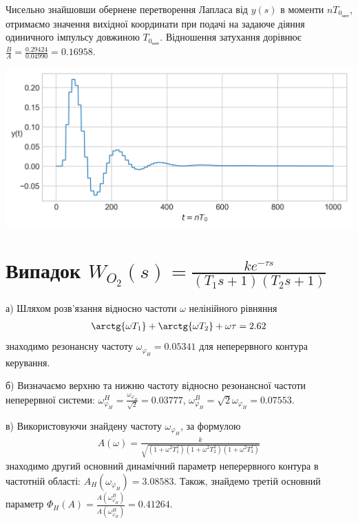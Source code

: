 Чисельно знайшовши обернене перетворення Лапласа від $y(s)$ в моменти $n T_{0_{\text{опт}}}$, 
отримаємо значення вихідної координати при подачі на задаюче діяння одиничного імпульсу довжиною $T_{0_{\text{опт}}}$. 
Відношення затухання дорівнює $\frac{B}{A} = \frac{0.29424}{0.04990} = 0.16958$.
\begin{center}
    \includegraphics[scale=0.9]{pics/transient_process_task_5_1.png}
\end{center}

\section{Випадок \texorpdfstring{$W_{O_2}(s) = \frac{k e^{-\tau s}}{(T_1 s + 1)(T_2 s + 1)}$}{2}}
а)\;  Шляхом розв'язання відносно частоти $\omega$ нелінійного рівняння
\begin{gather}
    \arctg{\omega T_1} + \arctg{\omega T_2} + \omega \tau = 2.62
\end{gather}
знаходимо резонансну частоту $\omega_{\varphi_H} = 0.05341$ для неперервного контура керування.

б)\;  Визначаємо верхню та нижню частоту відносно резонансної частоти неперервної системи:
$\omega_{\varphi_H}^H = \frac{\omega_{\varphi_H}}{\sqrt{2}} = 0.03777$, 
$\omega_{\varphi_H}^B = {\sqrt{2}}{\omega_{\varphi_H}} = 0.07553$.

в)\; Використовуючи знайдену частоту $\omega_{\varphi_H}$, за формулою
\begin{gather}
    A(\omega) = \frac{k}{\sqrt{\left(1+\omega^2 T_1^2\right)\left(1+\omega^2 T_2^2\right)\left(1+\omega^2 T_3^2\right)}}
\end{gather}
знаходимо другий основний динамічний параметр неперервного контура в частотній області:
$A_H\left(\omega_{\varphi_H}\right) = 3.08583$. Також, знайдемо третій основний параметр
$\Phi_H(A) = \frac{A\left(\omega_{\varphi_H}^B\right)}{A\left(\omega_{\varphi_H}^H\right)} = 0.41264$.

